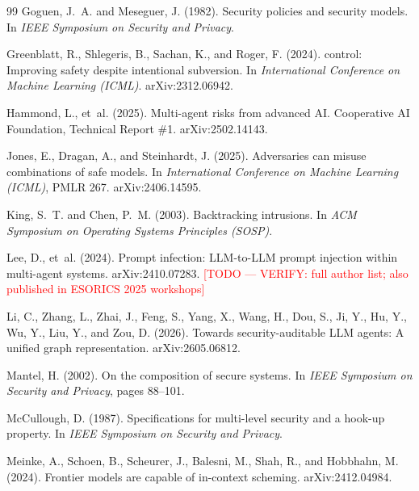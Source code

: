 \documentclass[11pt, a4paper]{article}
\newcommand{\todo}[1]{\textcolor{red}{[TODO --- #1]}}
\theoremstyle{definition}
\begin{document}
\begin{thebibliography}{99}
Goguen, J.~A. and Meseguer, J. (1982).
\newblock Security policies and security models.
\newblock In \emph{IEEE Symposium on Security and Privacy}.

Greenblatt, R., Shlegeris, B., Sachan, K., and Roger, F. (2024).
 control: Improving safety despite intentional subversion.
\newblock In \emph{International Conference on Machine Learning (ICML)}. arXiv:2312.06942.

Hammond, L., et~al. (2025).
\newblock Multi-agent risks from advanced {AI}.
\newblock Cooperative AI Foundation, Technical Report \#1. arXiv:2502.14143.

Jones, E., Dragan, A., and Steinhardt, J. (2025).
\newblock Adversaries can misuse combinations of safe models.
\newblock In \emph{International Conference on Machine Learning (ICML)}, PMLR 267. arXiv:2406.14595.

King, S.~T. and Chen, P.~M. (2003).
\newblock Backtracking intrusions.
\newblock In \emph{ACM Symposium on Operating Systems Principles (SOSP)}.

Lee, D., et~al. (2024).
\newblock Prompt infection: {LLM}-to-{LLM} prompt injection within multi-agent systems.
\newblock arXiv:2410.07283. \todo{VERIFY: full author list; also published in ESORICS 2025 workshops}

Li, C., Zhang, L., Zhai, J., Feng, S., Yang, X., Wang, H., Dou, S., Ji, Y., Hu, Y., Wu, Y., Liu, Y., and Zou, D. (2026).
\newblock Towards security-auditable {LLM} agents: A unified graph representation.
\newblock arXiv:2605.06812.

Mantel, H. (2002).
\newblock On the composition of secure systems.
\newblock In \emph{IEEE Symposium on Security and Privacy}, pages 88--101.

McCullough, D. (1987).
\newblock Specifications for multi-level security and a hook-up property.
\newblock In \emph{IEEE Symposium on Security and Privacy}.

Meinke, A., Schoen, B., Scheurer, J., Balesni, M., Shah, R., and Hobbhahn, M. (2024).
\newblock Frontier models are capable of in-context scheming.
\newblock arXiv:2412.04984.


\end{thebibliography}
\end{document}
